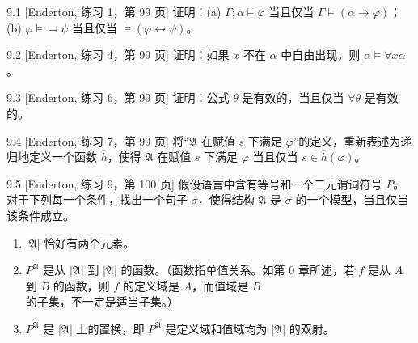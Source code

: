 
\begin{exercise}{9.1}
  [Enderton, 练习 1，第 99 页]
  证明：(a) $\Gamma;\alpha\vDash \varphi$ 当且仅当 $\Gamma\vDash(\alpha\to \varphi)$；(b) $\varphi\vDash\Dashv \psi$ 当且仅当 $\vDash(\varphi \leftrightarrow \psi)$。
\end{exercise}

\begin{exercise}{9.2}
  [Enderton, 练习 4，第 99 页]
  证明：如果 $x$ 不在 $\alpha$ 中自由出现，则 $\alpha\vDash\forall x \alpha$。
\end{exercise}

\begin{exercise}{9.3}
  [Enderton, 练习 6，第 99 页]
  证明：公式 $\theta$ 是有效的，当且仅当 $\forall\theta$ 是有效的。
\end{exercise}

\begin{exercise}{9.4}
  [Enderton, 练习 7，第 99 页]
  将“$\mathfrak{A}$ 在赋值 $s$ 下满足 $\varphi$”的定义，重新表述为递归地定义一个函数 $\overline{h}$，使得 $\mathfrak{A}$ 在赋值 $s$ 下满足 $\varphi$ 当且仅当 $s\in \overline{h}(\varphi)$。
\end{exercise}

\begin{exercise}{9.5}
  [Enderton, 练习 9，第 100 页]
  假设语言中含有等号和一个二元谓词符号 $P$。对于下列每一个条件，找出一个句子 $\sigma$，使得结构 $\mathfrak{A}$ 是 $\sigma$ 的一个模型，当且仅当该条件成立。
  \begin{enumerate}[label=(\alph*)]
    \item $|\mathfrak{A}|$ 恰好有两个元素。
    \item $P^{\mathfrak{A}}$ 是从 $|\mathfrak{A}|$ 到 $|\mathfrak{A}|$ 的函数。（函数指单值关系。如第 0 章所述，若 $f$ 是从 $A$ 到 $B$ 的函数，则 $f$ 的定义域是 $A$，而值域是 $B$ 的子集，不一定是适当子集。）
    \item $P^{\mathfrak{A}}$ 是 $|\mathfrak{A}|$ 上的置换，即 $P^{\mathfrak{A}}$ 是定义域和值域均为 $|\mathfrak{A}|$ 的双射。\qedhere
  \end{enumerate}
\end{exercise}

